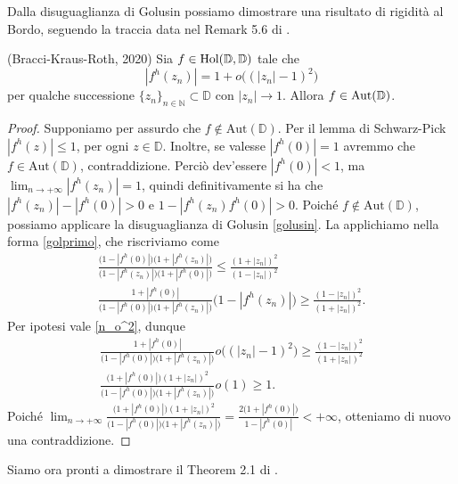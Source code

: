 Dalla disuguaglianza di Golusin possiamo dimostrare una risultato di rigidità al Bordo, seguendo la traccia data nel Remark 5.6 di \cite{BKR}.

\begin{thm} \label{boundary_schwarz_pick}
  (Bracci-Kraus-Roth, 2020) Sia $f \in \text{\normalfont{Hol}}(\mathbb{D},\mathbb{D})$ tale che
  \begin{equation} \label{n_o^2}
    |f^h(z_n)|=1+o\bigl((|z_n|-1)^2\bigr)
  \end{equation}
  per qualche successione $\{z_n\}_{n \in \mathbb{N}} \subset \mathbb{D}$ con $|z_n| \longrightarrow 1$. Allora $f \in \text{\normalfont{Aut}}(\mathbb{D})$.
\end{thm}

\begin{proof}
  Supponiamo per assurdo che $f \not\in \text{Aut}(\mathbb{D})$. Per il lemma di Schwarz-Pick $|f^h(z)| \le 1$, per ogni $z \in \mathbb{D}$. Inoltre, se valesse $|f^h(0)|=1$ avremmo che $f \in \text{Aut}(\mathbb{D})$, contraddizione.
  Perciò dev'essere $|f^h(0)|<1$, ma $\displaystyle \lim_{n \longrightarrow +\infty} |f^h(z_n)|=1$, quindi definitivamente si ha che $|f^h(z_n)|-|f^h(0)|>0$ e $1-|f^h(z_n)f^h(0)|>0$. Poiché $f \not\in \text{Aut}(\mathbb{D})$, possiamo applicare la disuguaglianza di Golusin \ref{golusin}. La applichiamo nella forma \eqref{golprimo}, che riscriviamo come
  \begin{align*}
    \frac{\bigl(1-|f^h(0)|\bigr)\bigl(1+|f^h(z_n)|\bigr)}{\bigl(1-|f^h(z_n)|\bigr)\bigl(1+|f^h(0)|\bigr)} \le \frac{(1+|z_n|)^2}{(1-|z_n|)^2} \\
    \frac{1+|f^h(0)|}{\bigl(1-|f^h(0)|\bigr)\bigl(1+|f^h(z_n)|\bigr)}\bigl(1-|f^h(z_n)|\bigr) \ge \frac{(1-|z_n|)^2}{(1+|z_n|)^2}.
  \end{align*}
  Per ipotesi vale \eqref{n_o^2}, dunque
  \begin{align*}
    \frac{1+|f^h(0)|}{\bigl(1-|f^h(0)|\bigr)\bigl(1+|f^h(z_n)|\bigr)}o\bigl((|z_n|-1)^2\bigr) \ge \frac{(1-|z_n|)^2}{(1+|z_n|)^2} \\
    \frac{\bigl(1+|f^h(0)|\bigr)(1+|z_n|)^2}{\bigl(1-|f^h(0)|\bigr)\bigl(1+|f^h(z_n)|\bigr)}o(1) \ge 1.
  \end{align*}
  Poiché $\displaystyle \lim_{n \longrightarrow +\infty} \frac{\bigl(1+|f^h(0)|\bigr)(1+|z_n|)^2}{\bigl(1-|f^h(0)|\bigr)\bigl(1+|f^h(z_n)|\bigr)}=\frac{2\bigl(1+|f^h(0)|\bigr)}{1-|f^h(0)|} < +\infty$, otteniamo di nuovo una contraddizione.
\end{proof}

Siamo ora pronti a dimostrare il Theorem 2.1 di \cite{BK}.
